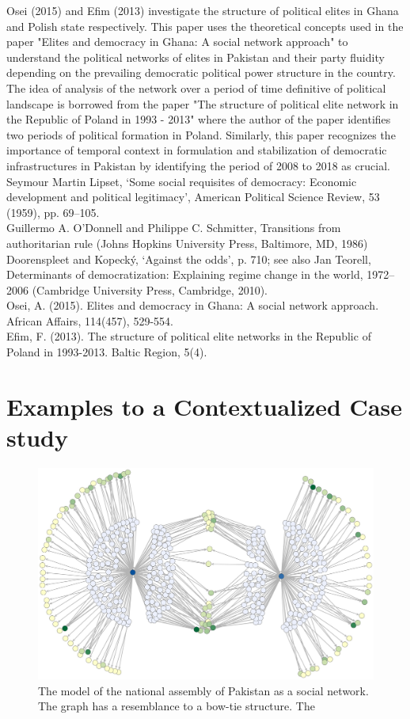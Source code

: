 \documentclass[runningheads]{llncs}
\begin{document}
\indent
Osei (2015) and Efim (2013) investigate the structure of political elites in Ghana and Polish state respectively. This paper uses the theoretical concepts used in the paper "Elites and democracy in Ghana: A social network approach" to understand the political networks of elites in Pakistan and their party fluidity depending on the prevailing democratic political power structure in the country. The idea of analysis of the network over a period of time definitive of political landscape is borrowed from the paper "The structure of political elite network in the Republic of Poland in 1993 - 2013" where the author of the paper identifies two periods of political formation in Poland. Similarly, this paper recognizes the importance of temporal context in formulation and stabilization of democratic infrastructures in Pakistan by identifying the period of 2008 to 2018 as crucial.
\indent
Seymour Martin Lipset, ‘Some social requisites of democracy: Economic development
and political legitimacy’, American Political Science Review, 53 (1959), pp. 69–105.\\
Guillermo A. O’Donnell and Philippe C. Schmitter, Transitions from authoritarian rule
(Johns Hopkins University Press, Baltimore, MD, 1986)\\
Doorenspleet and Kopecký, ‘Against the odds’, p. 710; see also Jan Teorell, Determinants
of democratization: Explaining regime change in the world, 1972–2006 (Cambridge University
Press, Cambridge, 2010).\\
Osei, A. (2015). Elites and democracy in Ghana: A social network approach. African Affairs, 114(457), 529-554.\\
Efim, F. (2013). The structure of political elite networks in the Republic of Poland in 1993-2013. Baltic Region, 5(4).\\
\section{Examples to a Contextualized Case study}

\begin{figure}
\includegraphics[width=\textwidth]{bowtie_structure.jpg}
\caption{The model of the national assembly of Pakistan as a social network. The graph has a resemblance to a bow-tie structure. The } \label{fig1}
\end{figure}
\end{document}
